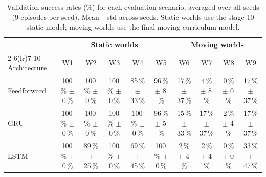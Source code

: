 \begin{table}[htbp]
\centering
\caption{Validation success rates (\%) for each evaluation scenario, averaged over all seeds (9 episodes per seed). Mean\,$\pm$\,std across seeds. Static worlds use the stage-10 static model; moving worlds use the final moving-curriculum model.}
\label{tab:validation}
\begin{tabular}{lccccccccc}
\toprule
 & \multicolumn{5}{c}{Static worlds} & \multicolumn{4}{c}{Moving worlds} \\
\cmidrule(lr){2-6}\cmidrule(lr){7-10}
Architecture & W1 & W2 & W3 & W4 & W5 & W6 & W7 & W8 & W9 \\
\midrule
Feedforward & 100\,\% $\pm$ 0\,\% & 100\,\% $\pm$ 0\,\% & 100\,\% $\pm$ 0\,\% & 85\,\% $\pm$ 33\,\% & 96\,\% $\pm$ 8\,\% & 17\,\% $\pm$ 37\,\% & 4\,\% $\pm$ 8\,\% & 0\,\% $\pm$ 0\,\% & 17\,\% $\pm$ 37\,\% \\
GRU & 100\,\% $\pm$ 0\,\% & 100\,\% $\pm$ 0\,\% & 100\,\% $\pm$ 0\,\% & 100\,\% $\pm$ 0\,\% & 96\,\% $\pm$ 5\,\% & 15\,\% $\pm$ 33\,\% & 17\,\% $\pm$ 37\,\% & 2\,\% $\pm$ 4\,\% & 17\,\% $\pm$ 37\,\% \\
LSTM & 100\,\% $\pm$ 0\,\% & 89\,\% $\pm$ 25\,\% & 100\,\% $\pm$ 0\,\% & 69\,\% $\pm$ 45\,\% & 100\,\% $\pm$ 0\,\% & 2\,\% $\pm$ 4\,\% & 2\,\% $\pm$ 4\,\% & 0\,\% $\pm$ 0\,\% & 33\,\% $\pm$ 47\,\% \\
\bottomrule
\end{tabular}
\end{table}